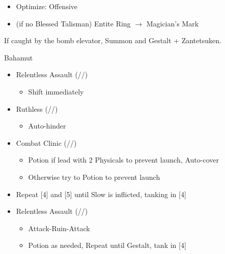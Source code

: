 \begin{multicols}{2}
\begin{menu}
\begin{itemize}
\begin{itemize}
        \begin{itemize}
                \item Optimize: Offensive
                \item (if no Blessed Talisman) Entite Ring $\rightarrow$ Magician's Mark
        \end{itemize}
    \end{itemize}
\end{itemize}
\end{menu}
If caught by the bomb elevator, Summon and Gestalt + Zantetsuken. 
\renewcommand{\first}{[1] Relentless Assault (\com/\rav/\rav)}
\renewcommand{\fifth}{[5] Ruthless (\sab/\com/\rav)
\renewcommand{\fourth}{[4] Combat Clinic (\sen/\med/\med)}}
\begin{battle}{Bahamut}
\begin{itemize}
    \item \first
    \begin{itemize}
        \item Shift immediately
    \end{itemize}
    \item \fifth
    \begin{itemize}
        \item Auto-hinder
    \end{itemize}
    \item \fourth
    \begin{itemize}
        \item Potion if lead with 2 Physicals to prevent launch, Auto-cover
        \item Otherwise try to Potion to prevent launch
    \end{itemize}
    \item Repeat [4] and [5] until Slow is inflicted, tanking in [4]
    \item \first
    \begin{itemize}
        \item Attack-Ruin-Attack
        \item Potion as needed, Repeat until Gestalt, tank in [4]
    \end{itemize}
\end{itemize}
\end{battle}
\end{multicols}
